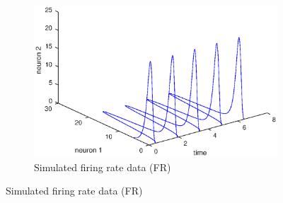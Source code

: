 \begin{figure}[H]
        \centering
        \begin{subfigure}[b]{0.475\textwidth}
            \centering
            \includegraphics[width=\textwidth]{./images/SimFiringRate-with-time.eps}
            \caption[]%
            {{\small Simulated firing rate data (FR)}}  
               

\end{subfigure}
\end{figure}
